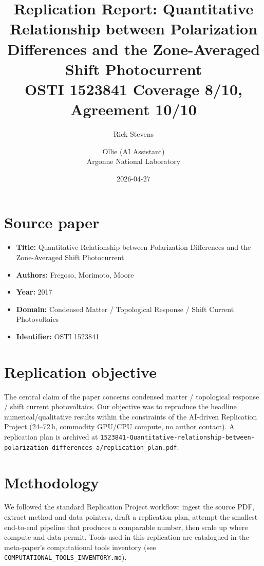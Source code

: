 \documentclass[11pt]{article}
\title{Replication Report: Quantitative Relationship between Polarization Differences and the Zone-Averaged Shift Photocurrent\\[2pt]\large OSTI 1523841 \textbar{} Coverage 8/10, Agreement 10/10}
\author{Rick Stevens \and Ollie (AI Assistant)\\\small Argonne National Laboratory}
\date{2026-04-27}
\begin{document}
\maketitle

\section{Source paper}
\begin{itemize}
\item \textbf{Title:} Quantitative Relationship between Polarization Differences and the Zone-Averaged Shift Photocurrent
\item \textbf{Authors:} Fregoso, Morimoto, Moore
\item \textbf{Year:} 2017
\item \textbf{Domain:} Condensed Matter / Topological Response / Shift Current Photovoltaics
\item \textbf{Identifier:} OSTI 1523841
\end{itemize}


\section{Replication objective}
The central claim of the paper concerns condensed matter / topological response / shift current photovoltaics. Our objective was to reproduce the headline numerical/qualitative results within the constraints of the AI-driven Replication Project (24--72\,h, commodity GPU/CPU compute, no author contact). A replication plan is archived at \texttt{1523841-Quantitative-relationship-between-polarization-differences-a/replication\_plan.pdf}.

\section{Methodology}
We followed the standard Replication Project workflow: ingest the source PDF, extract method and data pointers, draft a replication plan, attempt the smallest end-to-end pipeline that produces a comparable number, then scale up where compute and data permit. Tools used in this replication are catalogued in the meta-paper's computational tools inventory (see \texttt{COMPUTATIONAL\_TOOLS\_INVENTORY.md}).
\end{document}
